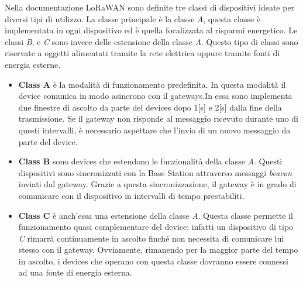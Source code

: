 Nella documentazione LoRaWAN sono definite tre classi di dispositivi ideate per 
diversi tipi di utilizzo. La classe principale è la classe \emph{A}, questa
classe è implementata in ogni dispositivo ed è quella focalizzata al risparmi
energetico. Le classi \emph{B}, e
\emph{C} sono invece delle estensione della classe \emph{A}. Questo tipo di classi sono
riservate a oggetti  alimentati tramite la rete elettrica oppure tramite 
fonti di energia esterne.  
\begin{itemize}
        \item   \textbf{Class A} è la modalità di funzionamento predefinita. 
                In questa modalità il device comunica in modo asincrono con il
                gateways.In essa sono implementa due finestre di ascolto da parte del devices
                dopo 1[s] e 2[s] dalla fine della trasmissione. Se il gateway non risponde al
                messaggio ricevuto durante uno di questi intervalli, è necessario aspettare che
                l'invio di un nuovo messaggio da parte del device.

        \item   \textbf{Class B} sono devices che estendono le funzionalità della classe
                \emph{A}. Questi dispositivi sono sincronizzati con la Base Station attraverso
                messaggi \emph{beacon} inviati dal gateway. Grazie a questa
                sincronizzazione, il gateway è in grado di comunicare con il
                dispositivo in intervalli di tempo prestabiliti.

        \item   \textbf{Class C} è anch'essa una estensione della classe \emph{A}. 
                Questa classe permette il funzionamento quasi complementare del device; infatti
                un  dispositivo di tipo \emph{C} rimarrà continuamente in ascolto finché non
                necessita di comunicare lui stesso con il gateway. Ovviamente, rimanendo per la
                maggior parte del tempo in ascolto, i devices che operano con questa classe
                dovranno essere connessi ad una fonte di energia esterna. 
\end{itemize}


